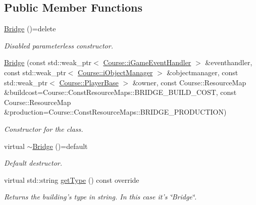 \subsection*{Public Member Functions}
\begin{DoxyCompactItemize}
\item 
\hypertarget{class_student_1_1_bridge_a0d55c11bd6e77e0d9e576c16ddcaacf1}{\hyperlink{class_student_1_1_bridge_a0d55c11bd6e77e0d9e576c16ddcaacf1}{Bridge} ()=delete}\label{class_student_1_1_bridge_a0d55c11bd6e77e0d9e576c16ddcaacf1}

\begin{DoxyCompactList}\small\item\em Disabled parameterless constructor. \end{DoxyCompactList}\item 
\hyperlink{class_student_1_1_bridge_ac4679951c6130585228b74467cb7ecca}{Bridge} (const std\-::weak\-\_\-ptr$<$ \hyperlink{class_course_1_1i_game_event_handler}{Course\-::i\-Game\-Event\-Handler} $>$ \&eventhandler, const std\-::weak\-\_\-ptr$<$ \hyperlink{class_course_1_1i_object_manager}{Course\-::i\-Object\-Manager} $>$ \&objectmanager, const std\-::weak\-\_\-ptr$<$ \hyperlink{class_course_1_1_player_base}{Course\-::\-Player\-Base} $>$ \&owner, const Course\-::\-Resource\-Map \&buildcost=Course\-::\-Const\-Resource\-Maps\-::\-B\-R\-I\-D\-G\-E\-\_\-\-B\-U\-I\-L\-D\-\_\-\-C\-O\-S\-T, const Course\-::\-Resource\-Map \&production=Course\-::\-Const\-Resource\-Maps\-::\-B\-R\-I\-D\-G\-E\-\_\-\-P\-R\-O\-D\-U\-C\-T\-I\-O\-N)
\begin{DoxyCompactList}\small\item\em Constructor for the class. \end{DoxyCompactList}\item 
\hypertarget{class_student_1_1_bridge_aa012656b62c512fdb78dcdb42781d39e}{virtual \hyperlink{class_student_1_1_bridge_aa012656b62c512fdb78dcdb42781d39e}{$\sim$\-Bridge} ()=default}\label{class_student_1_1_bridge_aa012656b62c512fdb78dcdb42781d39e}

\begin{DoxyCompactList}\small\item\em Default destructor. \end{DoxyCompactList}\item 
virtual std\-::string \hyperlink{class_student_1_1_bridge_a4c3d72252a2d1992e210accadecf5125}{get\-Type} () const override
\begin{DoxyCompactList}\small\item\em Returns the building's type in string. In this case it's \char`\"{}\-Bridge\char`\"{}. \end{DoxyCompactList}\end{DoxyCompactItemize}
